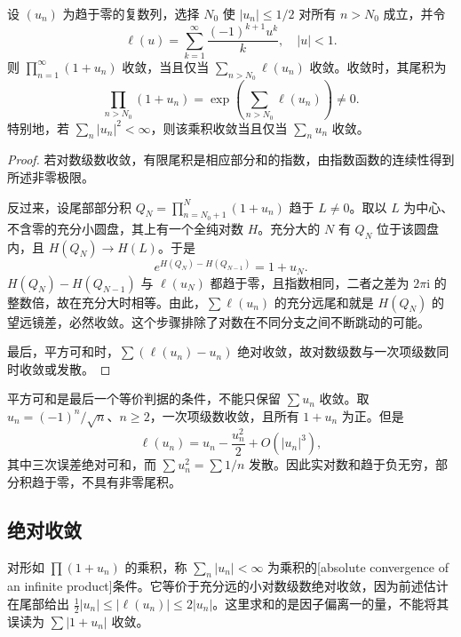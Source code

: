 \begin{proposition}[小对数判据]\label{b3:prop:20-product-log-test}
设 \((u_n)\) 为趋于零的复数列，选择 \(N_0\) 使 \(|u_n|\le1/2\) 对所有 \(n>N_0\) 成立，并令
\[
 \ell(u)=\sum_{k=1}^{\infty}\frac{(-1)^{k+1}u^k}{k},\quad |u|<1.
\]
则 \(\prod_{n=1}^{\infty}(1+u_n)\) 收敛，当且仅当 \(\sum_{n>N_0}\ell(u_n)\) 收敛。收敛时，其尾积为
\[
 \prod_{n>N_0}(1+u_n)
 =\exp\left(\sum_{n>N_0}\ell(u_n)\right)\ne0.
\]
特别地，若 \(\sum_n|u_n|^2<\infty\)，则该乘积收敛当且仅当 \(\sum_n u_n\) 收敛。
\end{proposition}
\begin{proof}
若对数级数收敛，有限尾积是相应部分和的指数，由指数函数的连续性得到所述非零极限。

反过来，设尾部部分积 \(Q_N=\prod_{n=N_0+1}^N(1+u_n)\) 趋于 \(L\ne0\)。取以 \(L\) 为中心、不含零的充分小圆盘，其上有一个全纯对数 \(H\)。充分大的 \(N\) 有 \(Q_N\) 位于该圆盘内，且 \(H(Q_N)\to H(L)\)。于是
\[
 e^{H(Q_N)-H(Q_{N-1})}=1+u_N.
\]
\(H(Q_N)-H(Q_{N-1})\) 与 \(\ell(u_N)\) 都趋于零，且指数相同，二者之差为 \(2\pi\mathrm{i}\) 的整数倍，故在充分大时相等。由此，\(\sum\ell(u_n)\) 的充分远尾和就是 \(H(Q_N)\) 的望远镜差，必然收敛。这个步骤排除了对数在不同分支之间不断跳动的可能。

最后，平方可和时，\(\sum(\ell(u_n)-u_n)\) 绝对收敛，故对数级数与一次项级数同时收敛或发散。
\end{proof}
平方可和是最后一个等价判据的条件，不能只保留 \(\sum u_n\) 收敛。取 \(u_n=(-1)^n/\sqrt n\)、\(n\ge2\)，一次项级数收敛，且所有 \(1+u_n\) 为正。但是
\[
 \ell(u_n)=u_n-\frac{u_n^2}{2}+O(|u_n|^3),
\]
其中三次误差绝对可和，而 \(\sum u_n^2=\sum1/n\) 发散。因此实对数和趋于负无穷，部分积趋于零，不具有非零尾积。

\subsection{绝对收敛}
\label{b3:subsec:200102}

对形如 \(\prod(1+u_n)\) 的乘积，称 \(\sum_n|u_n|<\infty\) 为乘积的[absolute convergence of an infinite product]条件。它等价于充分远的小对数级数绝对收敛，因为前述估计在尾部给出 \(\tfrac12|u_n|\le|\ell(u_n)|\le2|u_n|\)。这里求和的是因子偏离一的量，不能将其误读为 \(\sum|1+u_n|\) 收敛。

